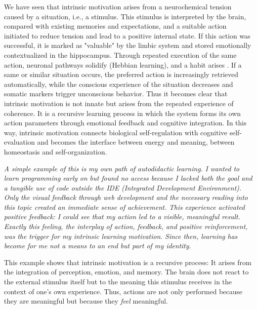 We have seen that intrinsic motivation arises from a neurochemical tension caused by a situation, i.e., a stimulus.
This stimulus is interpreted by the brain, compared with existing memories and expectations, and a suitable action initiated to reduce tension and lead to a positive internal state.
If this action was successful, it is marked as "valuable" by the limbic system and stored emotionally contextualized in the hippocampus.
Through repeated execution of the same action, neuronal pathways solidify (Hebbian learning), and a habit arises \cite{Hebb1949, Graybiel2008, YinKnowlton2006}.
If a same or similar situation occurs, the preferred action is increasingly retrieved automatically, while the conscious experience of the situation decreases and somatic markers trigger unconscious behavior.
Thus it becomes clear that intrinsic motivation is not innate but arises from the repeated experience of coherence.
It is a recursive learning process in which the system forms its own action parameters through emotional feedback and cognitive integration.
In this way, intrinsic motivation connects biological self-regulation with cognitive self-evaluation and becomes the interface between energy and meaning, between homeostasis and self-organization.

\begin{reflexion}
    \smallskip
    \textit{A simple example of this is my own path of autodidactic learning.
    I wanted to learn programming early on but found no access because I lacked both the goal and a tangible use of code outside the IDE (Integrated Development Environment).
    Only the visual feedback through web development and the necessary reading into this topic created an immediate sense of achievement.
    This experience activated positive feedback: I could see that my action led to a visible, meaningful result.
    Exactly this feeling, the interplay of action, feedback, and positive reinforcement, was the trigger for my intrinsic learning motivation.
    Since then, learning has become for me not a means to an end but part of my identity.}
\end{reflexion}

This example shows that intrinsic motivation is a recursive process: It arises from the integration of perception, emotion, and memory.
The brain does not react to the external stimulus itself but to the meaning this stimulus receives in the context of one's own experience.
Thus, actions are not only performed because they are meaningful but because they \emph{feel} meaningful.

